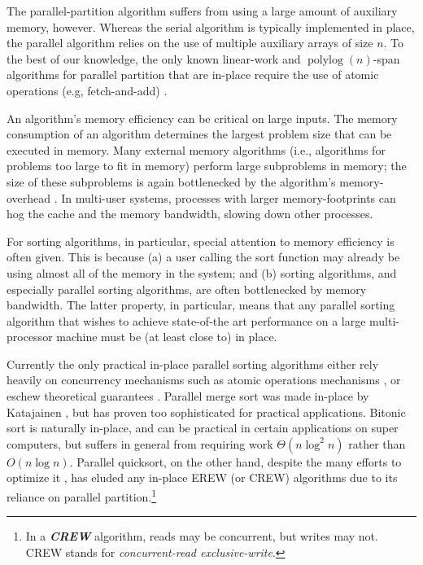 \documentclass[sigplan, 10pt, nonacm]{acmart}
\newcommand{\defn}[1]{{\textit{\textbf{\boldmath #1}}}}
\theoremstyle{remark}
\theoremstyle{remark}
\begin{document}
The parallel-partition algorithm suffers from using a large amount of
auxiliary memory, however. Whereas the serial algorithm is typically
implemented in place, the parallel algorithm relies on the use of multiple
auxiliary arrays of size $n$. To the best of our knowledge, the only
known linear-work and $\operatorname{polylog}(n)$-span algorithms for
parallel partition that are in-place require the use of atomic
operations (e.g, fetch-and-add)
\cite{HeidelbergerNo90,AxtmannWi17,TsigasZh03}.

An algorithm's memory efficiency can be critical on large inputs. The
memory consumption of an algorithm determines the largest problem size
that can be executed in memory. Many external memory algorithms (i.e.,
algorithms for problems too large to fit in memory) perform large
subproblems in memory; the size of these subproblems is again
bottlenecked by the algorithm's memory-overhead \cite{Vitter08}. In
multi-user systems, processes with larger memory-footprints can hog
the cache and the memory bandwidth, slowing down other processes.

For sorting algorithms, in particular, special attention to memory
efficiency is often given. This is because (a) a user calling the sort
function may already be using almost all of the memory in the system;
and (b) sorting algorithms, and especially parallel sorting
algorithms, are often bottlenecked by memory bandwidth. The latter
property, in particular, means that any parallel sorting algorithm
that wishes to achieve state-of-the art performance on a large
multi-processor machine must be (at least close to) in place.

Currently the only practical in-place parallel sorting algorithms either rely
heavily on concurrency mechanisms such as atomic operations mechanisms
\cite{HeidelbergerNo90, AxtmannWi17, TsigasZh03}, or eschew
theoretical guarantees \cite{FrancisPa92}. Parallel merge sort
\cite{Hagerup89} was made in-place by Katajainen \cite{Katajainen93},
but has proven too sophisticated for practical applications. Bitonic
sort \cite{BlellochLe98} is naturally in-place, and can be practical
in certain applications on super computers, but suffers in general
from requiring work $\Theta(n \log^2 n)$ rather than $O(n \log
n)$. Parallel quicksort, on the other hand, despite the many efforts
to optimize it \cite{HeidelbergerNo90, AxtmannWi17, TsigasZh03,
  FrancisPa92, Frias08}, has eluded any in-place EREW (or CREW)
algorithms due to its reliance on parallel partition.\footnote{In a
  \defn{CREW} algorithm, reads may be concurrent, but writes may
  not. CREW stands for \emph{concurrent-read exclusive-write}.}
\end{document}
